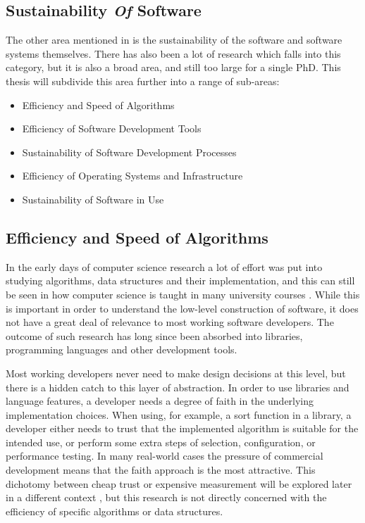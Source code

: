 
\subsection{Sustainability \emph{Of} Software}

The other area mentioned in \cite{Penzenstadler2013} is the sustainability of the software and software systems themselves. There has also been a lot of research which falls into this category, but it is also a broad area, and still too large for a single PhD. This thesis will subdivide this area further into a range of sub-areas:
\begin{itemize}
    \item Efficiency and Speed of Algorithms
    \item Efficiency of Software Development Tools
    \item Sustainability of Software Development Processes
    \item Efficiency of Operating Systems and Infrastructure
    \item Sustainability of Software in Use
\end{itemize}

\subsection{Efficiency and Speed of Algorithms}

In the early days of computer science research a lot of effort was put into studying algorithms, data structures and their implementation, and this can still be seen in how computer science is taught in many university courses . While this is important in order to understand the low-level construction of software, it does not have a great deal of relevance to most working software developers. The outcome of such research has long since been absorbed into libraries, programming languages and other development tools.

Most working developers never need to make design decisions at this level, but there is a hidden catch to this layer of abstraction. In order to use libraries and language features, a developer needs a degree of faith in the underlying implementation choices. When using, for example, a sort function in a library, a developer either needs to trust that the implemented algorithm is suitable for the intended use, or perform some extra steps of selection, configuration, or performance testing. In many real-world cases the pressure of commercial development means that the faith approach is the most attractive. This dichotomy between cheap trust or expensive measurement will be explored later in a different context , but this research is not directly concerned with the efficiency of specific algorithms or data structures.


